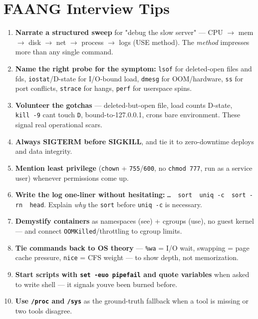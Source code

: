 \documentclass[11pt]{article}
\providecommand{\tightlist}{\setlength{\itemsep}{1pt}\setlength{\parskip}{0pt}}
\begin{document}
\section{FAANG Interview Tips}\label{faang-interview-tips}

\begin{enumerate}
\def\labelenumi{\arabic{enumi}.}
\tightlist
\item
  \textbf{Narrate a structured sweep} for "debug the slow server" --- CPU \(\rightarrow\) mem \(\rightarrow\) disk \(\rightarrow\) net \(\rightarrow\) process \(\rightarrow\) logs (USE method). The \emph{method} impresses more than any single command.
\item
  \textbf{Name the right probe for the symptom:} \texttt{lsof} for deleted-open files and fds, \texttt{iostat}/D-state for I/O-bound load, \texttt{dmesg} for OOM/hardware, \texttt{ss} for port conflicts, \texttt{strace} for hangs, \texttt{perf} for userspace spins.
\item
  \textbf{Volunteer the gotchas} --- deleted-but-open file, load counts D-state, \texttt{kill\ -9} can\textquotesingle t touch \texttt{D}, bound-to-127.0.0.1, cron\textquotesingle s bare environment. These signal real operational scars.
\item
  \textbf{Always SIGTERM before SIGKILL}, and tie it to zero-downtime deploys and data integrity.
\item
  \textbf{Mention least privilege} (\texttt{chown} + \texttt{755}/\texttt{600}, no \texttt{chmod\ 777}, run as a service user) whenever permissions come up.
\item
  \textbf{Write the log one-liner without hesitating:} \texttt{…\ \textbar{}\ sort\ \textbar{}\ uniq\ -c\ \textbar{}\ sort\ -rn\ \textbar{}\ head}. Explain \emph{why} the \texttt{sort} before \texttt{uniq\ -c} is necessary.
\item
  \textbf{Demystify containers} as namespaces (see) + cgroups (use), no guest kernel --- and connect \texttt{OOMKilled}/throttling to cgroup limits.
\item
  \textbf{Tie commands back to OS theory} --- \texttt{\%wa} = I/O wait, swapping = page cache pressure, \texttt{nice} = CFS weight --- to show depth, not memorization.
\item
  \textbf{Start scripts with \texttt{set\ -euo\ pipefail} and quote variables} when asked to write shell --- it signals you\textquotesingle ve been burned before.
\item
  \textbf{Use \texttt{/proc} and \texttt{/sys}} as the ground-truth fallback when a tool is missing or two tools disagree.
\end{enumerate}
\end{document}
